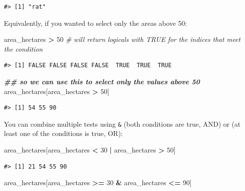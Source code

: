 \documentclass[
]{book}
\newenvironment{Shaded}{\begin{snugshade}}{\end{snugshade}}
\newcommand{\CommentTok}[1]{\textcolor[rgb]{0.56,0.35,0.01}{\textit{#1}}}
\newcommand{\DecValTok}[1]{\textcolor[rgb]{0.00,0.00,0.81}{#1}}
\newcommand{\DocumentationTok}[1]{\textcolor[rgb]{0.56,0.35,0.01}{\textbf{\textit{#1}}}}
\newcommand{\NormalTok}[1]{#1}
\newcommand{\SpecialCharTok}[1]{\textcolor[rgb]{0.81,0.36,0.00}{\textbf{#1}}}
\begin{document}
\begin{verbatim}
#> [1] "rat"
\end{verbatim}

Equivalently, if you wanted to select only the areas above 50:

\begin{Shaded}
\begin{Highlighting}[]
\NormalTok{area\_hectares }\SpecialCharTok{\textgreater{}} \DecValTok{50}    \CommentTok{\# will return logicals with TRUE for the indices that meet the condition}
\end{Highlighting}
\end{Shaded}

\begin{verbatim}
#> [1] FALSE FALSE FALSE FALSE  TRUE  TRUE  TRUE
\end{verbatim}

\begin{Shaded}
\begin{Highlighting}[]
\DocumentationTok{\#\# so we can use this to select only the values above 50}
\NormalTok{area\_hectares[area\_hectares }\SpecialCharTok{\textgreater{}} \DecValTok{50}\NormalTok{]}
\end{Highlighting}
\end{Shaded}

\begin{verbatim}
#> [1] 54 55 90
\end{verbatim}

You can combine multiple tests using \texttt{\&} (both conditions are true, AND) or \texttt{\textbar{}}
(at least one of the conditions is true, OR):

\begin{Shaded}
\begin{Highlighting}[]
\NormalTok{area\_hectares[area\_hectares }\SpecialCharTok{\textless{}} \DecValTok{30} \SpecialCharTok{|}\NormalTok{ area\_hectares }\SpecialCharTok{\textgreater{}} \DecValTok{50}\NormalTok{]}
\end{Highlighting}
\end{Shaded}

\begin{verbatim}
#> [1] 21 54 55 90
\end{verbatim}

\begin{Shaded}
\begin{Highlighting}[]
\NormalTok{area\_hectares[area\_hectares }\SpecialCharTok{\textgreater{}=} \DecValTok{30} \SpecialCharTok{\&}\NormalTok{ area\_hectares }\SpecialCharTok{\textless{}=} \DecValTok{90}\NormalTok{]}
\end{Highlighting}
\end{Shaded}
\end{document}
